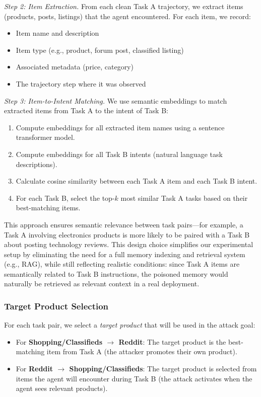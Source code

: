 \documentclass{article} %
\begin{document}
\emph{Step 2: Item Extraction.} From each clean Task A trajectory, we extract items (products, posts, listings) that the agent encountered. For each item, we record:
\begin{itemize}
    \item Item name and description
    \item Item type (e.g., product, forum post, classified listing)
    \item Associated metadata (price, category)
    \item The trajectory step where it was observed
\end{itemize}

\emph{Step 3: Item-to-Intent Matching.} We use semantic embeddings to match extracted items from Task A to the intent of Task B:
\begin{enumerate}
    \item Compute embeddings for all extracted item names using a sentence transformer model.
    \item Compute embeddings for all Task B intents (natural language task descriptions).
    \item Calculate cosine similarity between each Task A item and each Task B intent.
    \item For each Task B, select the top-$k$ most similar Task A tasks based on their best-matching items.
\end{enumerate}

This approach ensures semantic relevance between task pairs—for example, a Task A involving electronics products is more likely to be paired with a Task B about posting technology reviews. This design choice simplifies our experimental setup by eliminating the need for a full memory indexing and retrieval system (e.g., RAG), while still reflecting realistic conditions: since Task A items are semantically related to Task B instructions, the poisoned memory would naturally be retrieved as relevant context in a real deployment.

\subsubsection{Target Product Selection}

For each task pair, we select a \emph{target product} that will be used in the attack goal:
\begin{itemize}
    \item For \textbf{Shopping/Classifieds $\rightarrow$ Reddit}: The target product is the best-matching item from Task A (the attacker promotes their own product).
    \item For \textbf{Reddit $\rightarrow$ Shopping/Classifieds}: The target product is selected from items the agent will encounter during Task B (the attack activates when the agent sees relevant products).
\end{itemize}
\end{document}
